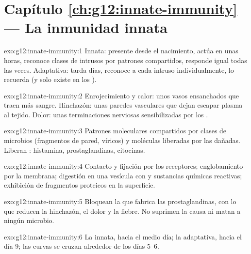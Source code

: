 \section*{Capítulo \ref{ch:g12:innate-immunity} --- La inmunidad innata}

\begin{solution}{exo:g12:innate-immunity:1}
Innata: presente desde el nacimiento, actúa en unas horas, reconoce
clases de intrusos por patrones compartidos, responde igual todas las
veces. Adaptativa: tarda días, reconoce a cada intruso individualmente,
lo recuerda (y solo existe en los ).
\end{solution}

\begin{solution}{exo:g12:innate-immunity:2}
Enrojecimiento y calor: unos vasos ensanchados que traen más sangre.
Hinchazón: unas paredes vasculares que dejan escapar plasma al tejido.
Dolor: unas terminaciones nerviosas sensibilizadas por los .
\end{solution}

\begin{solution}{exo:g12:innate-immunity:3}
Patrones moleculares compartidos por clases de microbios (fragmentos de
pared,  víricos) y moléculas liberadas por las 
dañadas. Liberan : histamina, prostaglandinas, citocinas.
\end{solution}

\begin{solution}{exo:g12:innate-immunity:4}
Contacto y fijación por los receptores; englobamiento por la membrana;
digestión en una vesícula con  y sustancias químicas reactivas;
exhibición de fragmentos proteicos en la superficie.
\end{solution}

\begin{solution}{exo:g12:innate-immunity:5}
Bloquean la  que fabrica las prostaglandinas, con lo que reducen
la hinchazón, el dolor y la fiebre. No suprimen la causa ni matan a
ningún microbio.
\end{solution}

\begin{solution}{exo:g12:innate-immunity:6}
La innata, hacia el medio día; la adaptativa, hacia el día 9; las
curvas se cruzan alrededor de los días 5--6.
\end{solution}

